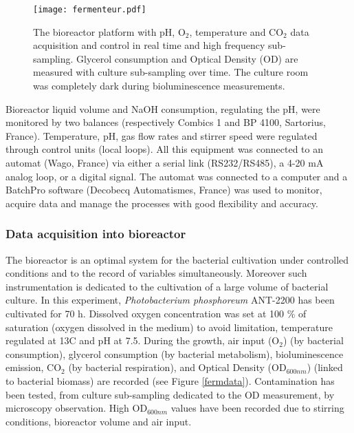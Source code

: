 \begin{figure}[!h]
\linespread{1} 
\centering
\texttt{[image: fermenteur.pdf]}
\caption[The bioreactor platform with pH, O$_2$, temperature and CO$_2$ data acquisition and control in real time and high frequency sub-sampling.]{The bioreactor platform with pH, O$_2$, temperature and CO$_2$ data acquisition and control in real time and high frequency sub-sampling. Glycerol consumption and Optical Density (OD) are measured with culture sub-sampling over time. The culture room was completely dark during bioluminescence measurements.}
\label{fermenteur}
\end{figure} 

Bioreactor liquid volume and NaOH consumption,
regulating the pH, were monitored by two balances (respectively Combics 1 and BP 4100, Sartorius, France). Temperature, pH,
gas flow rates and stirrer speed were regulated through control units (local loops). All this equipment was connected to an automat (Wago, France) via either a serial link (RS232/RS485), a 4-20 mA analog loop, or a digital signal. The automat was connected to a computer and a BatchPro software (Decobecq Automatismes, France)
was used to monitor, acquire data and manage the processes with
good flexibility and accuracy. \\

\subsubsection*{Data acquisition into bioreactor}

The bioreactor is an optimal system for the bacterial cultivation under controlled conditions and to the record of variables simultaneously. Moreover such instrumentation is dedicated to the cultivation of a large volume of bacterial culture. In this experiment, \textit{Photobacterium phosphoreum} ANT-2200 has been cultivated for 70 h. Dissolved oxygen concentration was set at 100 \% of saturation (oxygen dissolved in the medium) to avoid limitation, temperature regulated at 13\degres C and pH at 7.5. During the growth, air input (O$_2$) (by bacterial consumption), glycerol consumption (by bacterial metabolism), bioluminescence emission, CO$_2$ (by bacterial respiration), and Optical Density (OD$_{600nm}$) (linked to bacterial biomass) are recorded (see Figure \ref{fermdata}). Contamination has been tested, from culture sub-sampling dedicated to the OD measurement, by microscopy observation. High OD$_{600nm}$ values have been recorded due to stirring conditions, bioreactor volume and air input.\\

